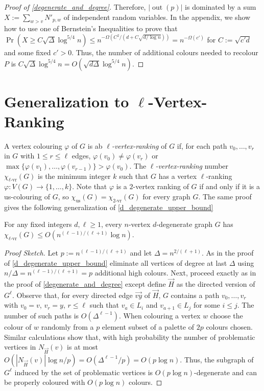 \documentclass{patmorin}
\newcommand{\defin}[1]{\emph{\color{brightmaroon}#1}}
\DeclareMathOperator{\outn}{out}
\newcommand{\rn}[1]{\chi_{\operatorname{#1-vr}}}
\newcommand{\trn}{\chi_{\mathrm{us}}}
\newcommand{\lrn}{\rn{\ell}}
\begin{document}
\begin{proof}[Proof of \cref{degenerate_and_degree}]
  Therefore, $|\outn(p)|$ is dominated by a sum $X:=\sum_{w> v} N'_{p,w}$ of independent random variables.  In the appendix, we show how to use one of Bernstein's Inequalities to prove that $\Pr\left(X\ge C\sqrt{\Delta}\log^{5/4} n\right)\le n^{-\Omega(C^2/(d+C\sqrt{d/\log n}))} = n^{-\Omega(c')}$ for $C:=\sqrt{c'd}$ and some fixed $c'>0$.  Thus, the number of additional colours needed to recolour $P$ is $C\sqrt{\Delta}\log^{5/4} n = O(\sqrt{d\Delta}\log^{5/4} n)$.
\end{proof}

\section{Generalization to $\ell$-Vertex-Ranking}

A vertex colouring $\varphi$ of $G$ is ab \defin{$\ell$-vertex-ranking} of $G$ if, for each path $v_0,\ldots,v_r$ in $G$ with $1\le r\le\ell$ edges, $\varphi(v_0)\neq \varphi(v_r)$ or $\max\{\varphi(v_1),\ldots,\varphi(v_{r-1})\}>\varphi(v_0)$.  The \defin{$\ell$-vertex-ranking} number $\lrn(G)$ is the minimum integer $k$ such that $G$ has a vertex $\ell$-ranking $\varphi:V(G)\to\{1,\ldots,k\}$.  Note that $\varphi$ is a $2$-vertex ranking of $G$ if and only if it is a us-colouring of $G$, so $\trn(G)=\rn{2}(G)$ for every graph $G$.  The same proof gives the following generalization of \cref{d_degenerate_upper_bound}

\begin{thm}
  For any fixed integers $d,\ell\ge 1$, every $n$-vertex $d$-degenerate graph $G$ has $\lrn(G) \le O(n^{(\ell-1)/(\ell+1)}\log  n)$.
\end{thm}

\begin{proof}[Proof Sketch]
  Let $p:=n^{(\ell-1)/(\ell+1)}$ and let $\Delta=n^{2/(\ell+1)}$.  As in the proof of \cref{d_degenerate_upper_bound} eliminate all vertices of degree at last $\Delta$ using $n/\Delta = n^{(\ell-1)/(\ell+1)}=p$ additional high colours.  Next, proceed exactly as in the proof of \cref{degenerate_and_degree} except define $\overrightarrow{H}$ as the directed version of $G^{\ell}$.  Observe that, for every directed edge $\overrightarrow{vy}$ of $\overrightarrow{H}$, $G$ contains a path $v_0,\ldots,v_r$ with $v_0=v$, $v_r=y$, $r\le \ell$ such that $v_a\in L_i$ and $v_{a+1}\in L_j$ for some $i\le j$.  The number of such paths is $O(\Delta^{\ell-1})$. When colouring a vertex $w$ choose the colour of $w$ randomly from a $p$ element subset of a palette of $2p$ colours chosen.  Similar calculations show that, with high probability the number of problematic vertices in $N_{\overrightarrow{H}}(v)$ is at most $O(|N_{\overrightarrow{H}}(v)|\log n/p)=O(\Delta^{\ell-1}/p)=O(p\log n)$.  Thus, the subgraph of $G^\ell$ induced by the set of problematic vertices is $O(p\log n)$-degenerate and can be properly coloured with $O(p\log n)$ colours.
\end{proof}
\end{document}
